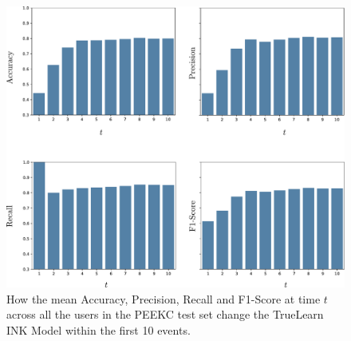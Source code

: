 \documentclass[letterpaper]{article} %
\begin{document}
\begin{figure}[h]
\begin{center}
    \centerline{\includegraphics[width=\linewidth]{ink_metrics.pdf}}
    \caption{How the mean Accuracy, Precision, Recall and F1-Score at time $t$ across all the users in the PEEKC test set change the TrueLearn INK Model within the first 10 events.}
    \label{fig:INK_MET}
\end{center}
\end{figure}

\end{document}
